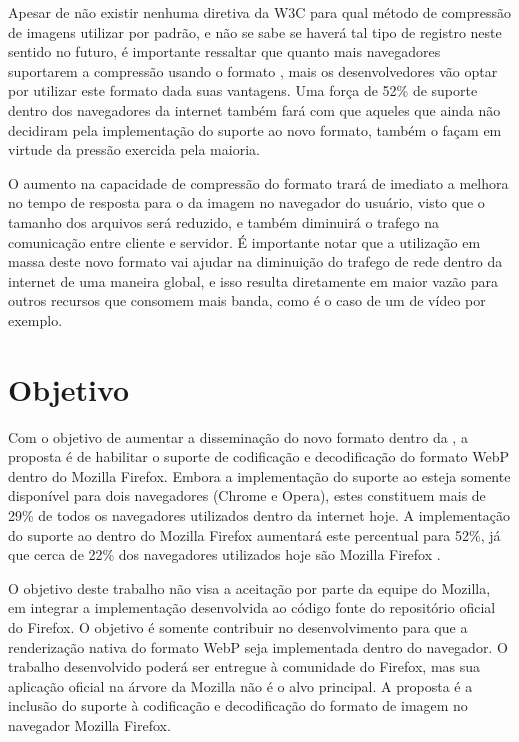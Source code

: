 \documentclass[espaco=simples,appendix=Name]{abnt}
\begin{document}
Apesar de não existir nenhuma diretiva da W3C para qual método de compressão de imagens utilizar por padrão, e não se sabe se haverá tal tipo de registro neste sentido no futuro, é importante ressaltar que quanto mais navegadores suportarem a compressão usando o formato , mais os desenvolvedores vão optar por utilizar este formato dada suas vantagens. Uma força de 52\% de suporte dentro dos navegadores da internet também fará com que aqueles que ainda não decidiram pela implementação do suporte ao novo formato, também o façam em virtude da pressão exercida pela maioria.

O aumento na capacidade de compressão do formato  trará de imediato a melhora no tempo de resposta para o  da imagem no navegador do usuário, visto que o tamanho dos arquivos será reduzido, e também diminuirá o trafego na comunicação entre cliente e servidor. É importante notar que a utilização em massa deste novo formato vai ajudar na diminuição do trafego de rede dentro da internet de uma maneira global, e isso resulta diretamente em maior vazão para outros recursos que consomem mais banda, como é o caso de um  de vídeo por exemplo.

\section{Objetivo}

Com o objetivo de aumentar a disseminação do novo formato dentro da , a proposta é de habilitar o suporte de codificação e decodificação do formato WebP dentro do Mozilla Firefox. Embora a implementação do suporte ao  esteja somente disponível para dois navegadores (Chrome e Opera), estes constituem mais de 29\% de todos os navegadores utilizados dentro da internet hoje. A implementação do suporte ao  dentro do Mozilla Firefox aumentará este percentual para 52\%, já que cerca de 22\% dos navegadores utilizados hoje são Mozilla Firefox \cite{BrowserStats}.

O objetivo deste trabalho não visa a aceitação por parte da equipe do Mozilla, em integrar a implementação desenvolvida ao código fonte do repositório oficial do Firefox. O objetivo é somente contribuir no desenvolvimento para que a renderização nativa do formato WebP seja implementada dentro do navegador. O trabalho desenvolvido poderá ser entregue à comunidade do Firefox, mas sua aplicação oficial na árvore da Mozilla não é o alvo principal. A proposta é a inclusão do suporte à codificação e decodificação do formato de imagem  no navegador Mozilla Firefox.
\end{document}
